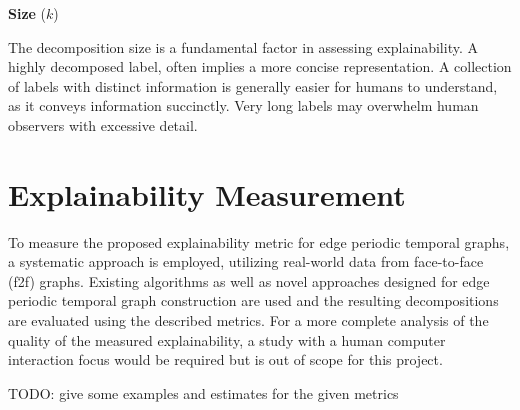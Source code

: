 \textbf{Size} ($k$)

The decomposition size is a fundamental factor in assessing explainability. A highly decomposed label, often implies a more concise representation. A collection of labels with distinct information is generally easier for humans to understand, as it conveys information succinctly. Very long labels may overwhelm human observers with excessive detail.


\section{Explainability Measurement}

To measure the proposed explainability metric for edge periodic temporal graphs, a systematic approach is employed, utilizing real-world data from face-to-face (f2f) graphs. Existing algorithms as well as novel approaches designed for edge periodic temporal graph construction are used and the resulting decompositions are evaluated using the described metrics. For a more complete analysis of the quality of the measured explainability, a study with a human computer interaction focus would be required but is out of scope for this project.

TODO: give some examples and estimates for the given metrics
